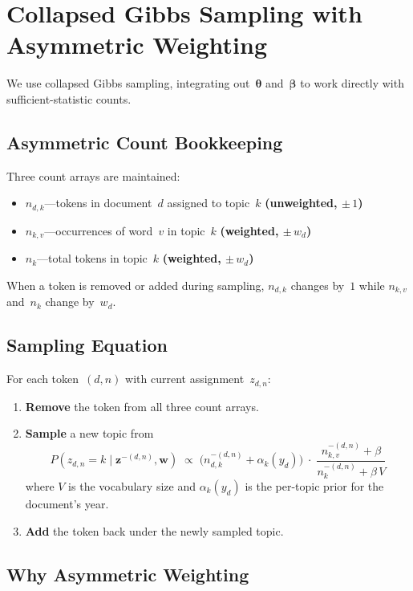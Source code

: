 \documentclass[11pt]{article}
\begin{document}
\section{Collapsed Gibbs Sampling with Asymmetric Weighting}

We use collapsed Gibbs sampling, integrating out~$\boldsymbol\theta$ and~$\boldsymbol\beta$ to work directly with sufficient-statistic counts.

\subsection{Asymmetric Count Bookkeeping}

Three count arrays are maintained:
\begin{itemize}
\item $n_{d,k}$\;---\;tokens in document~$d$ assigned to topic~$k$ \textbf{(unweighted, $\pm\,1$)}
\item $n_{k,v}$\;---\;occurrences of word~$v$ in topic~$k$ \textbf{(weighted, $\pm\,w_d$)}
\item $n_{k}$\;---\;total tokens in topic~$k$ \textbf{(weighted, $\pm\,w_d$)}
\end{itemize}
When a token is removed or added during sampling, $n_{d,k}$ changes by~$1$ while $n_{k,v}$ and~$n_k$ change by~$w_d$.

\subsection{Sampling Equation}

For each token~$(d,n)$ with current assignment~$z_{d,n}$:

\begin{enumerate}
\item \textbf{Remove} the token from all three count arrays.
\item \textbf{Sample} a new topic from
\[
P(z_{d,n} = k \mid \mathbf z^{-(d,n)}, \mathbf w)
  \;\propto\;
  \bigl(n_{d,k}^{-(d,n)} + \alpha_k(y_d)\bigr)
  \;\cdot\;
  \frac{n_{k,v}^{-(d,n)} + \beta}
       {n_{k}^{-(d,n)} + \beta\,V}
\]
where $V$ is the vocabulary size and $\alpha_k(y_d)$ is the per-topic prior for the document's year.
\item \textbf{Add} the token back under the newly sampled topic.
\end{enumerate}

\subsection{Why Asymmetric Weighting}
\end{document}
